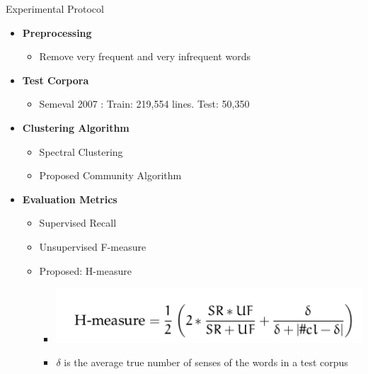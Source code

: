 \documentclass[10pt,=table]{beamer}
\begin{document}
\begin{frame}{Experimental Protocol}
	\begin{itemize}
		\item<1-> \large \textbf{Preprocessing}
			\begin{itemize}
				\item<1-> Remove very frequent and very infrequent words
			\end{itemize}
		\item<2-> \textbf{Test Corpora}
			\begin{itemize}
			\item<2-> Semeval 2007 \cite{SangM03}: Train: 219,554 lines. Test: 50,350 
			\end{itemize}
		\item<3-> \textbf{Clustering Algorithm}
			\begin{itemize}
				\item<3-> Spectral Clustering \cite{Shi2000}
				\item<3-> Proposed Community Algorithm
			\end{itemize}

		\item<4-> \textbf{Evaluation Metrics}
			\begin{itemize}
				\item<4-> Supervised Recall
				\item<4-> Unsupervised  F-measure
				\item<5-> Proposed: H-measure
				\begin{itemize}
				\item<5->[] \includegraphics[width=0.6\linewidth]{image2/Chapitre4/h-measure}
				\item<5->[] \small $\delta$ is the average true number of senses of the words in a test corpus

				\end{itemize}
			\end{itemize}
	\end{itemize}	 
	\vspace{\textheight}
\end{frame}
\end{document}
